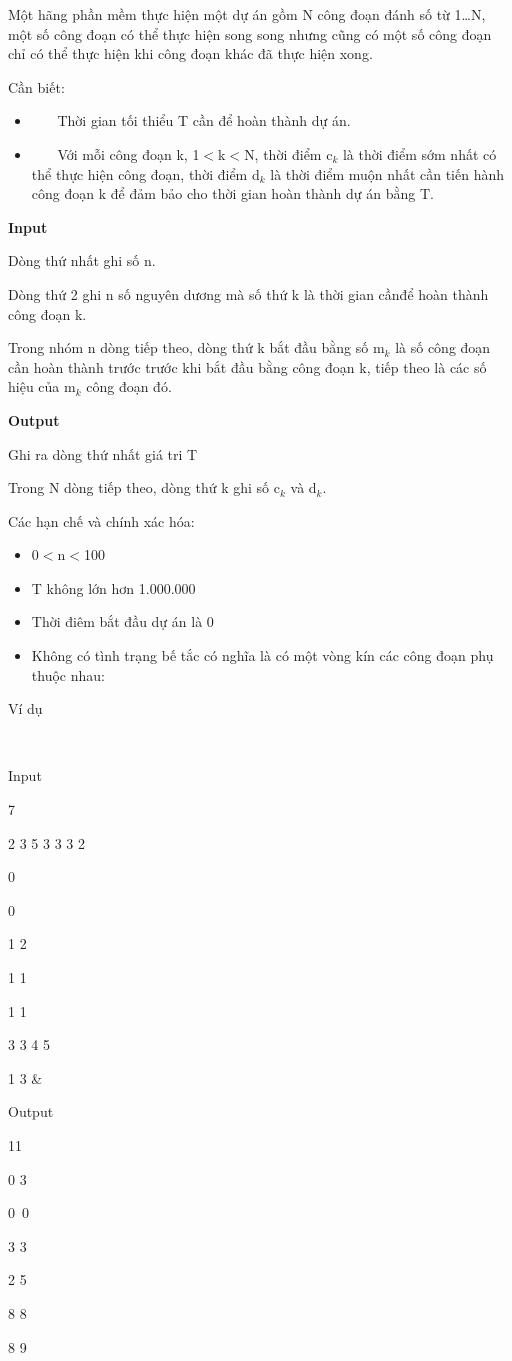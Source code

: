

Một hãng phần mềm thực hiện một dự án gồm N công đoạn đánh số từ 1…N, một số công đoạn có thể thực hiện song song nhưng cũng có một số công đoạn chỉ có thể thực hiện khi công đoạn khác đã thực hiện xong.

Cần biết:
\begin{itemize}
	\item     Thời gian tối thiểu T cần để hoàn thành dự án.
\end{itemize}
\begin{itemize}
	\item     Với mỗi công đoạn k, 1$<$k$<$N, thời điểm c$_k$ là thời điểm sớm nhất có thể thực hiện công đoạn, thời điểm d$_k$ là thời điểm muộn nhất cần tiến hành công đoạn k để đảm bảo cho thời gian hoàn thành dự án bằng T.
\end{itemize}

\textbf{Input}


Dòng thứ nhất ghi số n.

Dòng thứ 2 ghi n số nguyên dương mà số thứ k là thời gian cầnđể hoàn thành công đoạn k.

Trong nhóm n dòng tiếp theo, dòng thứ k bắt đầu bằng số m$_k$ là số công đoạn cần hoàn thành trước trước khi bắt đầu bằng công đoạn k, tiếp theo là các số hiệu của m$_k$ công đoạn đó.

\textbf{Output}


Ghi ra dòng thứ nhất giá tri T

Trong N dòng tiếp theo, dòng thứ k ghi số c$_k$ và d$_k$.

Các hạn chế và chính xác hóa:
\begin{itemize}
	\item 0$<$n$<$100
\end{itemize}
\begin{itemize}
	\item T không lớn hơn 1.000.000
\end{itemize}
\begin{itemize}
	\item Thời điêm bắt đầu dự án là 0
\end{itemize}
\begin{itemize}
	\item Không có tình trạng bế tắc có nghĩa là có một vòng kín các công đoạn phụ thuộc nhau:
\end{itemize}

Ví dụ

 
\begin{tabular}

Input

7

2 3 5 3 3 3 2

0

0

1 2

1 1

1 1

3 3 4 5

1 3 & 

Output

11

0 3

0 0

3 3

2 5

8 8

8 9
\end{tabular}
